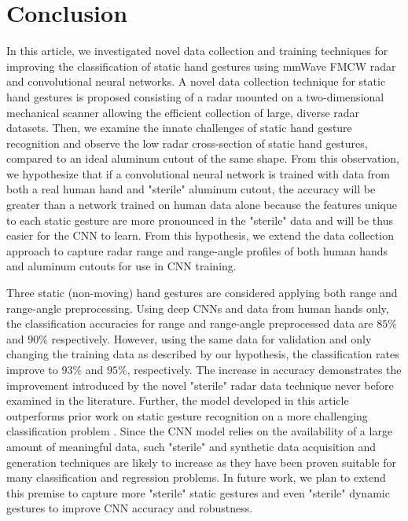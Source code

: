 \documentclass{ieeeaccess}
\begin{document}
\section{Conclusion}
\label{sec:conclusion}
In this article, we investigated novel data collection and training techniques for improving the classification of static hand gestures using mmWave FMCW radar and convolutional neural networks. A novel data collection technique for static hand gestures is proposed consisting of a radar mounted on a two-dimensional mechanical scanner allowing the efficient collection of large, diverse radar datasets. Then, we examine the innate challenges of static hand gesture recognition and observe the low radar cross-section of static hand gestures, compared to an ideal aluminum cutout of the same shape. From this observation, we hypothesize that if a convolutional neural network is trained with data from both a real human hand and "sterile" aluminum cutout, the accuracy will be greater than a network trained on human data alone because the features unique to each static gesture are more pronounced in the "sterile" data and will be thus easier for the CNN to learn. From this hypothesis, we extend the data collection approach to capture radar range and range-angle profiles of both human hands and aluminum cutouts for use in CNN training.

Three static (non-moving) hand gestures are considered applying both range and range-angle preprocessing. Using deep CNNs and data from human hands only, the classification accuracies for range and range-angle preprocessed data are $85\%$ and $90\%$ respectively. However, using the same data for validation and only changing the training data as described by our hypothesis, the classification rates improve to $93\%$ and $95\%$, respectively. The increase in accuracy demonstrates the improvement introduced by the novel "sterile" radar data technique never before examined in the literature. Further, the model developed in this article outperforms prior work on static gesture recognition on a more challenging classification problem \cite{static_gesture_recognition:time_domain}. Since the CNN model relies on the availability of a large amount of meaningful data, such "sterile" and synthetic data acquisition and generation techniques are likely to increase as they have been proven suitable for many classification and regression problems. In future work, we plan to extend this premise to capture more "sterile" static gestures and even "sterile" dynamic gestures to improve CNN accuracy and robustness.
\end{document}
